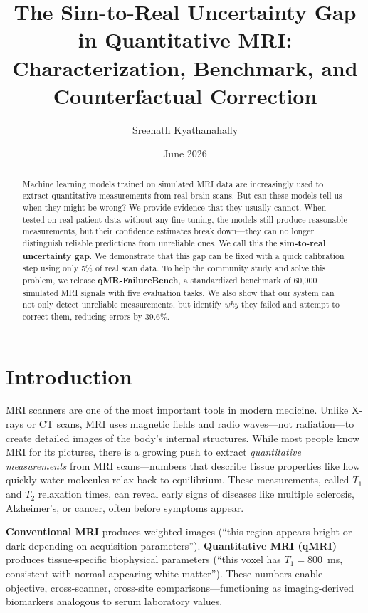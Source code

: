 \documentclass[11pt,a4paper]{article}
\title{\textbf{The Sim-to-Real Uncertainty Gap in Quantitative MRI:\\Characterization, Benchmark, and Counterfactual Correction}}
\author{Sreenath Kyathanahally}
\date{June 2026}
\begin{document}
\maketitle

\begin{abstract}
Machine learning models trained on simulated MRI data are increasingly used to extract quantitative measurements from real brain scans. But can these models tell us when they might be wrong? We provide evidence that they usually cannot. When tested on real patient data without any fine-tuning, the models still produce reasonable measurements, but their confidence estimates break down---they can no longer distinguish reliable predictions from unreliable ones. We call this the \textbf{sim-to-real uncertainty gap}. We demonstrate that this gap can be fixed with a quick calibration step using only 5\% of real scan data. To help the community study and solve this problem, we release \textbf{qMR-FailureBench}, a standardized benchmark of 60,000 simulated MRI signals with five evaluation tasks. We also show that our system can not only detect unreliable measurements, but identify \emph{why} they failed and attempt to correct them, reducing errors by 39.6\%.
\end{abstract}

\section{Introduction}
\label{sec:intro}

MRI scanners are one of the most important tools in modern medicine. Unlike X-rays or CT scans, MRI uses magnetic fields and radio waves---not radiation---to create detailed images of the body's internal structures. While most people know MRI for its pictures, there is a growing push to extract \emph{quantitative measurements} from MRI scans---numbers that describe tissue properties like how quickly water molecules relax back to equilibrium. These measurements, called $T_1$ and $T_2$ relaxation times, can reveal early signs of diseases like multiple sclerosis, Alzheimer's, or cancer, often before symptoms appear.

\begin{intuition}
\textbf{Conventional MRI} produces weighted images (``this region appears bright or dark depending on acquisition parameters''). \textbf{Quantitative MRI (qMRI)} produces tissue-specific biophysical parameters (``this voxel has $T_1 = 800$~ms, consistent with normal-appearing white matter''). These numbers enable objective, cross-scanner, cross-site comparisons---functioning as imaging-derived biomarkers analogous to serum laboratory values.
\end{intuition}
\end{document}

